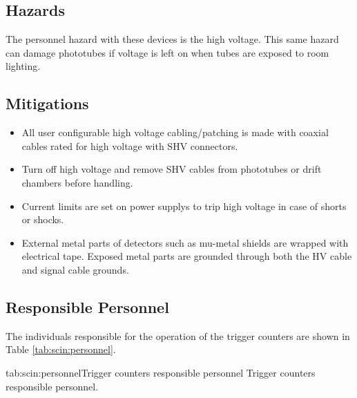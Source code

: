 \begin{safetyen}{0}{0}
\subsection{Hazards}

The personnel hazard with these devices is the high voltage.
This same hazard can
damage phototubes if voltage is left on when tubes are exposed to room
lighting.

\subsection{Mitigations}
\begin{itemize}
  \item All user configurable high voltage cabling/patching is made with
  coaxial cables rated for high voltage with SHV connectors.
  \item Turn off high voltage and remove SHV cables from phototubes
  or drift chambers before handling.
  \item Current limits are set on power supplys to trip high voltage in case
  of shorts or shocks.
  \item External metal parts of detectors such as mu-metal shields are wrapped
  with electrical tape.  Exposed metal parts are grounded through both the HV
  cable and signal cable grounds.
\end{itemize}

\subsection{Responsible Personnel}

The individuals responsible for the operation
of the trigger counters are shown in Table \ref{tab:scin:personnel}.

\begin{namestab}{tab:scin:personnel}{Trigger counters responsible personnel} {%
      Trigger counters responsible personnel.}
  \StephenWood{}
  \MahlonLong{}
  \JoeBeaufait{}
  \JackSegal{}
\end{namestab}
\end{safetyen}

